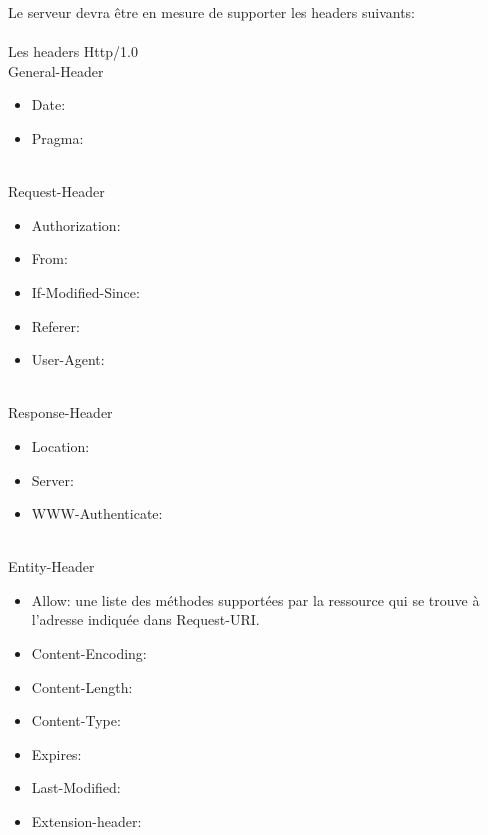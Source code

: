 \documentclass{scrreprt}
\begin{document}
Le serveur devra être en mesure de supporter les headers suivants: \\
\\
Les headers Http/1.0\\
    General-Header\\
        \begin{itemize}
        \item Date: 
        \item Pragma:    
        \end{itemize}
\\
    Request-Header\\
        \begin{itemize}
        \item Authorization:
        \item From:      
        \item If-Modified-Since:
        \item Referer:          
        \item User-Agent:       
        \end{itemize}
\\
    Response-Header\\
        \begin{itemize}
        \item Location:           
        \item Server:          
        \item WWW-Authenticate:
        \end{itemize}
\\
    Entity-Header\\
        \begin{itemize}
        \item Allow: une liste des méthodes supportées par la ressource qui se trouve à l'adresse indiquée dans Request-URI.               
        \item Content-Encoding: 
        \item Content-Length:    
        \item Content-Type:      
        \item Expires:           
        \item Last-Modified:     
        \item Extension-header:
        \end{itemize}
\end{document}
